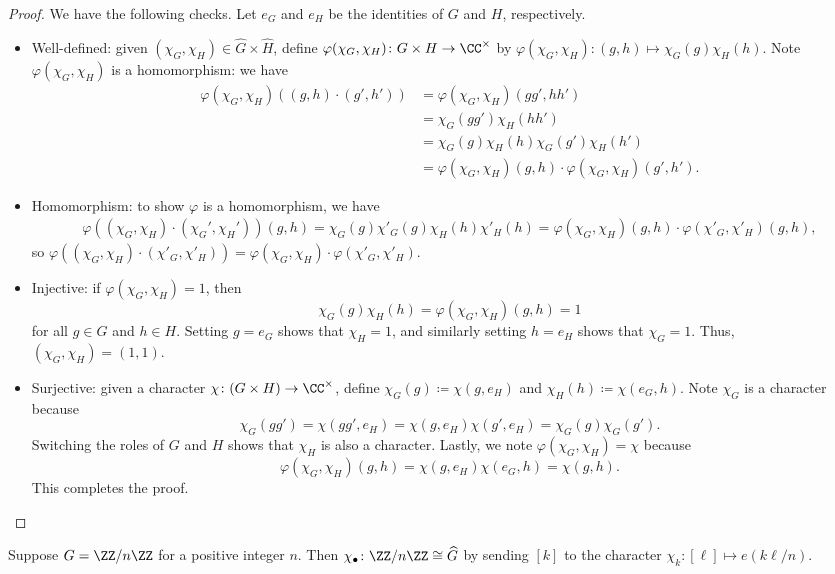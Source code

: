 \documentclass[../notes.tex]{subfiles}
\begin{document}
\begin{proof}
	We have the following checks. Let $e_G$ and $e_H$ be the identities of $G$ and $H$, respectively.
	\begin{itemize}
		\item Well-defined: given $(\chi_G,\chi_H)\in \widehat{G}\times \widehat{H}$, define $\varphi(\chi_G,\chi_H)\colon G\times H\to\CC^\times$ by $\varphi(\chi_G,\chi_H)\colon(g,h)\mapsto\chi_G(g)\chi_H(h)$. Note $\varphi(\chi_G,\chi_H)$ is a homomorphism: we have
		\begin{align*}
			\varphi(\chi_G,\chi_H)((g,h)\cdot(g',h')) &= \varphi(\chi_G,\chi_H)(gg',hh') \\
			&= \chi_G(gg')\chi_H(hh') \\
			&= \chi_G(g)\chi_H(h)\chi_G(g')\chi_H(h') \\
			&=\varphi(\chi_G,\chi_H)(g,h)\cdot\varphi(\chi_G,\chi_H)(g',h').
		\end{align*}
		\item Homomorphism: to show $\varphi$ is a homomorphism, we have
		\begin{align*}
			\varphi((\chi_G,\chi_H)\cdot(\chi_G',\chi_H'))(g,h)=\chi_G(g)\chi'_G(g)\chi_H(h)\chi'_H(h)=\varphi(\chi_G,\chi_H)(g,h)\cdot\varphi(\chi'_G,\chi'_H)(g,h),
		\end{align*}
		so $\varphi((\chi_G,\chi_H)\cdot(\chi'_G,\chi'_H))=\varphi(\chi_G,\chi_H)\cdot\varphi(\chi'_G,\chi'_H)$.
		\item Injective: if $\varphi(\chi_G,\chi_H)=1$, then
		\[\chi_G(g)\chi_H(h)=\varphi(\chi_G,\chi_H)(g,h)=1\]
		for all $g\in G$ and $h\in H$. Setting $g=e_G$ shows that $\chi_H=1$, and similarly setting $h=e_H$ shows that $\chi_G=1$. Thus, $(\chi_G,\chi_H)=(1,1)$.
		\item Surjective: given a character $\chi\colon(G\times H)\to\CC^\times$, define $\chi_G(g)\coloneqq\chi(g,e_H)$ and $\chi_H(h)\coloneqq\chi(e_G,h)$. Note $\chi_G$ is a character because
		\[\chi_G(gg')=\chi(gg',e_H)=\chi(g,e_H)\chi(g',e_H)=\chi_G(g)\chi_G(g').\]
		Switching the roles of $G$ and $H$ shows that $\chi_H$ is also a character. Lastly, we note $\varphi(\chi_G,\chi_H)=\chi$ because
		\[\varphi(\chi_G,\chi_H)(g,h)=\chi(g,e_H)\chi(e_G,h)=\chi(g,h).\]
		This completes the proof.
		\qedhere
	\end{itemize}
\end{proof}
\begin{lemma} \label{lem:cyclic-dual}
	Suppose $G=\ZZ/n\ZZ$ for a positive integer $n$. Then $\chi_\bullet\colon\ZZ/n\ZZ\cong \widehat{G}$ by sending $[k]$ to the character $\chi_k\colon[\ell]\mapsto e(k\ell/n)$.
\end{lemma}
\end{document}
